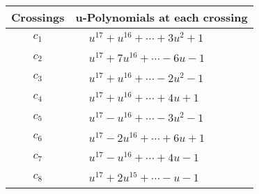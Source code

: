\documentclass[1p]{elsarticle_modified}
\theoremstyle{definition}
\begin{document}
\begin{tabular}{m{50pt}|m{274pt}}
Crossings & \hspace{64pt}u-Polynomials at each crossing \\
\hline $$\begin{aligned}c_{1}\end{aligned}$$&$\begin{aligned}
&u^{17}+u^{16}+\cdots+3 u^2+1
\end{aligned}$\\
\hline $$\begin{aligned}c_{2}\end{aligned}$$&$\begin{aligned}
&u^{17}+7 u^{16}+\cdots-6 u-1
\end{aligned}$\\
\hline $$\begin{aligned}c_{3}\end{aligned}$$&$\begin{aligned}
&u^{17}+u^{16}+\cdots-2 u^2-1
\end{aligned}$\\
\hline $$\begin{aligned}c_{4}\end{aligned}$$&$\begin{aligned}
&u^{17}+u^{16}+\cdots+4 u+1
\end{aligned}$\\
\hline $$\begin{aligned}c_{5}\end{aligned}$$&$\begin{aligned}
&u^{17}- u^{16}+\cdots-3 u^2-1
\end{aligned}$\\
\hline $$\begin{aligned}c_{6}\end{aligned}$$&$\begin{aligned}
&u^{17}-2 u^{16}+\cdots+6 u+1
\end{aligned}$\\
\hline $$\begin{aligned}c_{7}\end{aligned}$$&$\begin{aligned}
&u^{17}- u^{16}+\cdots+4 u-1
\end{aligned}$\\
\hline $$\begin{aligned}c_{8}\end{aligned}$$&$\begin{aligned}
&u^{17}+2 u^{15}+\cdots- u-1
\end{aligned}$\\

\end{tabular}
\end{document}
